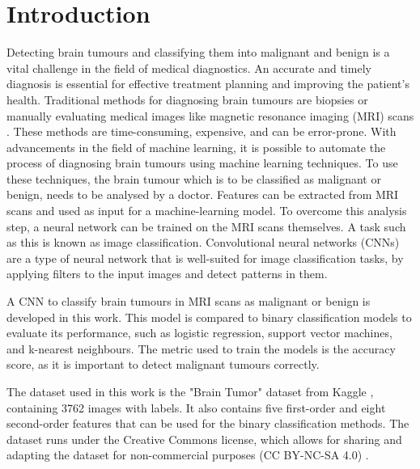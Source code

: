 \chapter{Introduction}
\label{cha:introduction}

Detecting brain tumours and classifying them into malignant and benign is a vital challenge in the field of medical diagnostics. 
An accurate and timely diagnosis is essential for effective treatment planning and improving the patient's health.
Traditional methods for diagnosing brain tumours are biopsies or manually evaluating medical images like magnetic resonance imaging (MRI) scans \cite{CancerResearUK}.
These methods are time-consuming, expensive, and can be error-prone. 
With advancements in the field of machine learning, it is possible to automate the process of diagnosing brain tumours using machine learning techniques. %
To use these techniques, the brain tumour which is to be classified as malignant or benign, needs to be analysed by a doctor.
Features can be extracted from MRI scans and used as input for a machine-learning model.
To overcome this analysis step, a neural network can be trained on the MRI scans themselves.
A task such as this is known as image classification.
Convolutional neural networks (CNNs) are a type of neural network that is well-suited for image classification tasks, by applying filters to the input images and detect patterns in them.

A CNN to classify brain tumours in MRI scans as malignant or benign is developed in this work.
This model is compared to binary classification models to evaluate its performance, such as logistic regression, support vector machines, and k-nearest neighbours.
The metric used to train the models is the accuracy score, as it is important to detect malignant tumours correctly.

The dataset used in this work is the "Brain Tumor" dataset from Kaggle \cite{jakesh_bohaju_2020}, containing 3762 images with labels. %
It also contains five first-order and eight second-order features that can be used for the binary classification methods.
The dataset runs under the Creative Commons license, which allows for sharing and adapting the dataset for non-commercial purposes (CC BY-NC-SA 4.0) \cite{license}. %

